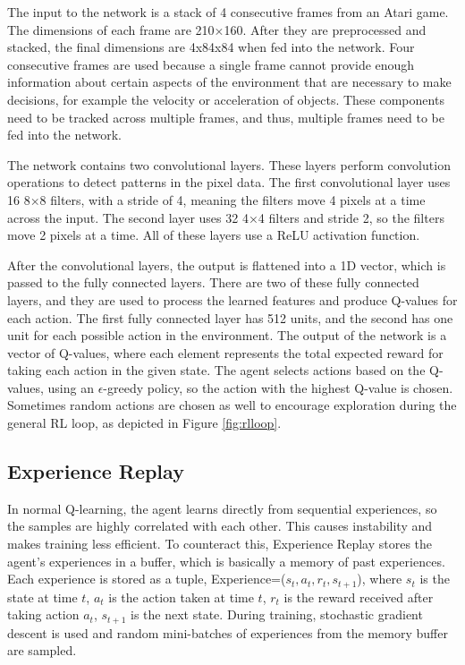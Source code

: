 \documentclass{article}
\begin{document}
The input to the network is a stack of 4 consecutive frames from an Atari game. The dimensions of each frame are 210×160. After they are preprocessed and stacked, the final dimensions are 4x84x84 when fed into the network. Four consecutive frames are used because a single frame cannot provide enough information about certain aspects of the environment that are necessary to make decisions, for example the velocity or acceleration of objects. These components need to be tracked across multiple frames, and thus, multiple frames need to be fed into the network.

The network contains two convolutional layers. These layers perform convolution operations to detect patterns in the pixel data. The first convolutional layer uses 16 8×8 filters, with a stride of 4, meaning the filters move 4 pixels at a time across the input. The second layer uses 32 4×4 filters and stride 2, so the filters move 2 pixels at a time. All of these layers use a ReLU activation function.

After the convolutional layers, the output is flattened into a 1D vector, which is passed to the fully connected layers. There are two of these fully connected layers, and they are used to process the learned features and produce Q-values for each action.
The first fully connected layer has 512 units, and the second has one unit for each possible action in the environment.
The output of the network is a vector of Q-values, where each element represents the total expected reward for taking each action in the given state.
The agent selects actions based on the Q-values, using an $\epsilon$-greedy policy, so the action with the highest Q-value is chosen. Sometimes random actions are chosen as well to encourage exploration during the general RL loop, as depicted in Figure \ref{fig:rlloop}.

\subsection{Experience Replay}
In normal Q-learning, the agent learns directly from sequential experiences, so the samples are highly correlated with each other.
This causes instability and makes training less efficient.
To counteract this, Experience Replay stores the agent’s experiences in a buffer, which is basically a memory of past experiences. Each experience is stored as a tuple, Experience=($s_{t},a_{t},r_{t},s_{t+1}$), where
$s_{t}$ is the state at time $t$, 
$a_{t}$ is the action taken at time $t$, 
$r_{t}$ is the reward received after taking action $a_{t}$, 
$s_{t+1}$ is the next state. During training, stochastic gradient descent is used and random mini-batches of experiences from the memory buffer are sampled.
\end{document}
